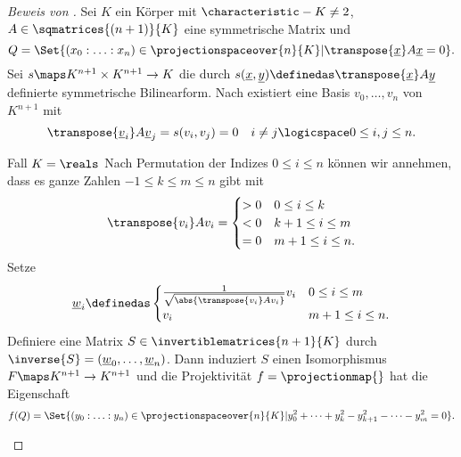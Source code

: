 
\begin{proof}[Beweis von ]
  Sei \( K \) ein Körper mit \( \characteristic-{K}\neq 2 \), \( A\in \sqmatrices{(n+1)}{K} \) eine symmetrische Matrix und
  \begin{equation*}
    Q=\Set{(x_0:\dotsc:x_n)\in \projectionspaceover{n}{K}|\transpose{\underline{x}}A\underline{x}=0}.
  \end{equation*}
  Sei \( s\maps K^{n+1}\times K^{n+1}\to K \) die durch \( s(\underline{x},\underline{y})\definedas \transpose{\underline{x}}A\underline{y} \) definierte symmetrische Bilinearform. Nach  existiert eine Basis \( v_0,\dotsc,v_n \) von \( K^{n+1} \) mit 
  \begin{equation*}
    \transpose{\underline{v}_i}A\underline{v}_j=s(v_i,v_j)=0\quad i\neq j\logicspace  0\leq i,j\leq n.
  \end{equation*}
  \begin{proofdescription}
    \item[Fall \( K=\reals \)] Nach Permutation der Indizes \( 0\leq i\leq n \) können wir annehmen, dass es ganze Zahlen \( -1\leq k\leq m\leq n \) gibt mit
    \begin{equation*}
      \transpose{v_i}A v_i=\begin{cases}
        >0 & 0\leq i\leq k\\
        <0 & k+1\leq i\leq m\\
        =0 & m+1\leq i\leq n.
      \end{cases}
    \end{equation*}
    Setze
    \begin{equation*}
      \underline{w}_i\definedas \begin{cases}
        \frac{1}{\sqrt{\abs{\transpose{v_i}Av_i}}}v_i&0\leq i\leq m\\
        v_i & m+1\leq i\leq n.
      \end{cases}
    \end{equation*}
    Definiere eine Matrix \( S\in \invertiblematrices{n+1}{K} \) durch \( \inverse{S}=(\underline{w}_0,\dotsc,\underline{w}_n) \). Dann induziert \( S \) einen Isomorphismus \( F\maps K^{n+1}\to K^{n+1} \) und die Projektivität \( f=\projectionmap{} \) hat die Eigenschaft
    \begin{equation*}
      f(Q)=\Set{(y_0:\dotsc:y_n)\in \projectionspaceover{n}{K}|y_0^2+\dotsb+y_k^2-y_{k+1}^2-\dotsb-y_m^2=0}.

\end{equation*}
\end{proofdescription}
\end{proof}
